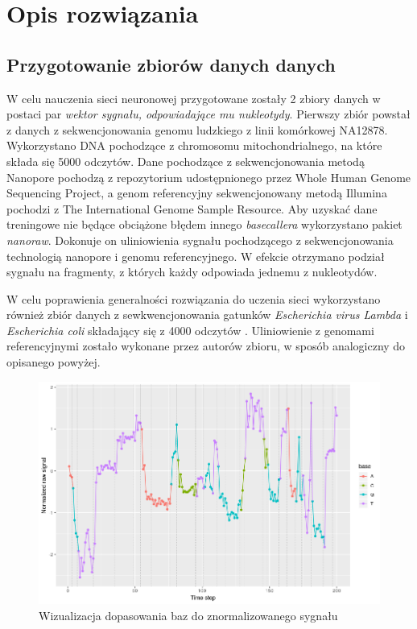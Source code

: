 \documentclass[a4paper,11pt,twoside]{report}
\theoremstyle{definition}
\begin{document}
\chapter{Opis rozwiązania}

\section{Przygotowanie zbiorów danych danych}

W celu nauczenia sieci neuronowej przygotowane zostały 2 zbiory danych w postaci par \textit{wektor sygnału, odpowiadające mu nukleotydy}.
Pierwszy zbiór powstał z danych z sekwencjonowania genomu ludzkiego z linii komórkowej NA12878. Wykorzystano DNA pochodzące z chromosomu mitochondrialnego, na które składa się 5000 odczytów.
Dane pochodzące z sekwencjonowania metodą Nanopore pochodzą z repozytorium udostępnionego przez Whole Human Genome Sequencing Project\cite{nanoporeHuman}, a genom referencyjny sekwencjonowany metodą Illumina pochodzi z The International Genome Sample Resource\cite{refGenome}. Aby uzyskać dane treningowe nie będące obciążone błędem innego \textit{basecallera} wykorzystano pakiet \textit{nanoraw}\cite{nanoraw}. Dokonuje on uliniowienia sygnału pochodzącego z sekwencjonowania technologią nanopore i genomu referencyjnego. W efekcie otrzymano podział sygnału na fragmenty, z których każdy odpowiada jednemu z nukleotydów.

W celu poprawienia generalności rozwiązania do uczenia sieci wykorzystano również zbiór danych z sewkwencjonowania gatunków \textit{Escherichia virus Lambda} i \textit{Escherichia coli} składający się z 4000 odczytów \cite{chironData}. Uliniowienie z genomami referencyjnymi zostało wykonane przez autorów zbioru, w sposób analogiczny do opisanego powyżej.

\begin{figure}[h!]
	\centering
	\includegraphics[scale=0.7]{squiggle}
	\caption{Wizualizacja dopasowania baz do znormalizowanego sygnału}
\end{figure}
\end{document}
